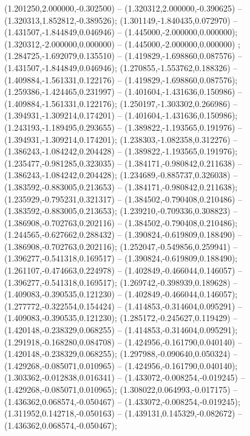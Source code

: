  (1.201250,2.000000,-0.302500) -- (1.320312,2.000000,-0.390625) -- (1.320313,1.852812,-0.389526);
 (1.301149,-1.840435,0.072970) -- (1.431507,-1.844849,0.046946) -- (1.445000,-2.000000,0.000000);
 (1.320312,-2.000000,0.000000) -- (1.445000,-2.000000,0.000000) ;
 (1.284725,-1.692079,0.135510) -- (1.419829,-1.698860,0.087576) -- (1.431507,-1.844849,0.046946);
 (1.270855,-1.553762,0.188326) -- (1.409884,-1.561331,0.122176) -- (1.419829,-1.698860,0.087576);
 (1.259386,-1.424465,0.231997) -- (1.401604,-1.431636,0.150986) -- (1.409884,-1.561331,0.122176);
 (1.250197,-1.303302,0.266986) -- (1.394931,-1.309214,0.174201) -- (1.401604,-1.431636,0.150986);
 (1.243193,-1.189495,0.293655) -- (1.389822,-1.193565,0.191976) -- (1.394931,-1.309214,0.174201);
 (1.238303,-1.082358,0.312276) -- (1.386243,-1.084242,0.204428) -- (1.389822,-1.193565,0.191976);
 (1.235477,-0.981285,0.323035) -- (1.384171,-0.980842,0.211638) -- (1.386243,-1.084242,0.204428);
 (1.234689,-0.885737,0.326038) -- (1.383592,-0.883005,0.213653) -- (1.384171,-0.980842,0.211638);
 (1.235929,-0.795231,0.321317) -- (1.384502,-0.790408,0.210486) -- (1.383592,-0.883005,0.213653);
 (1.239210,-0.709336,0.308823) -- (1.386908,-0.702763,0.202116) -- (1.384502,-0.790408,0.210486);
 (1.244565,-0.627662,0.288432) -- (1.390824,-0.619809,0.188490) -- (1.386908,-0.702763,0.202116);
 (1.252047,-0.549856,0.259941) -- (1.396277,-0.541318,0.169517) -- (1.390824,-0.619809,0.188490);
 (1.261107,-0.474663,0.224978) -- (1.402849,-0.466044,0.146057) -- (1.396277,-0.541318,0.169517);
 (1.269742,-0.398939,0.189628) -- (1.409083,-0.390535,0.121230) -- (1.402849,-0.466044,0.146057);
 (1.277772,-0.322554,0.154424) -- (1.414853,-0.314604,0.095291) -- (1.409083,-0.390535,0.121230);
 (1.285172,-0.245627,0.119429) -- (1.420148,-0.238329,0.068255) -- (1.414853,-0.314604,0.095291);
 (1.291918,-0.168280,0.084708) -- (1.424956,-0.161790,0.040140) -- (1.420148,-0.238329,0.068255);
 (1.297988,-0.090640,0.050324) -- (1.429268,-0.085071,0.010965) -- (1.424956,-0.161790,0.040140);
 (1.303362,-0.012838,0.016341) -- (1.433072,-0.008254,-0.019245) -- (1.429268,-0.085071,0.010965);
 (1.308022,0.064993,-0.017175) -- (1.436362,0.068574,-0.050467) -- (1.433072,-0.008254,-0.019245);
 (1.311952,0.142718,-0.050163) -- (1.439131,0.145329,-0.082672) -- (1.436362,0.068574,-0.050467);
